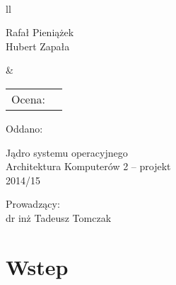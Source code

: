 \documentclass[a4paper,12pt]{article}
\begin{document}
\thispagestyle{empty}

\noindent
\unitlength=1mm
\fboxrule=1mm
\setlength{\fboxrule}{3pt}\\[+2mm]
\begin{tabular}{ll}
\begin{minipage}[t]{110mm}
{\LARGE\sf 
Rafał Pieniążek\\
Hubert Zapała}
\end{minipage}
 &
\begin{minipage}[t]{55mm}
{\Large\sf 
\begin{tabular}{ll}
Ocena:  & \raisebox{-3mm}{\framebox(20,9)[cc]{}}\\
\end{tabular}
}
\end{minipage}
\end{tabular}

\hfill {\Large\sf Oddano: }\\[+10mm]

\begin{center}
{\huge\sf Jądro systemu operacyjnego}\\[+10mm]
{\Large\sc 
Architektura Komputerów 2 -- projekt\\
2014/15\\[+10mm]}
\end{center}

\noindent
{\sc 
\hspace*{70mm}Prowadz\k{a}cy:\\
\hspace*{70mm}dr inż Tadeusz Tomczak\\
}

\newpage
\tableofcontents %
\newpage
	
	\section{Wstep}
\end{document}

